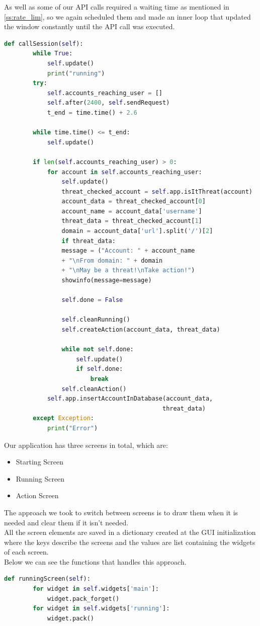 As well as some of our API calls required a waiting time as mentioned in \ref{ss:rate_lim},
so we again scheduled them and made an inner loop that updated the window constantly until the API call was executed.
\\[5pt]
\begin{lstlisting}[language=python, caption={Updating the window while calling API functions}, captionpos=b]
	def callSession(self):
		while True:
			self.update()
			print("running")
		try:
			self.accounts_reaching_user = []
			self.after(2400, self.sendRequest)
			t_end = time.time() + 2.6
		
		while time.time() <= t_end:
			self.update()
		
		if len(self.accounts_reaching_user) > 0:
			for account in self.accounts_reaching_user:
				self.update()
				threat_checked_account = self.app.isItThreat(account)
				account_data = threat_checked_account[0]
				account_name = account_data['username']
				threat_data = threat_checked_account[1]
				domain = account_data['url'].split('/')[2]
				if threat_data:
				message = ("Account: " + account_name
				+ "\nFrom domain: " + domain 
				+ "\nMay be a threat!\nTake action!")
				showinfo(message=message)
		
				self.done = False
		
				self.cleanRunning() 
				self.createAction(account_data, threat_data)
		
				while not self.done:
					self.update()
					if self.done:
						break
				self.cleanAction()
			self.app.insertAccountInDatabase(account_data, 
											threat_data)
		except Exception:
			print("Error")
\end{lstlisting}
Our application has three screens in total, which are:
\begin{itemize}
	\item Starting Screen
	\item Running Screen
	\item Action Screen
\end{itemize}
The approach we took to switch between screens is to draw them when it is needed and
clear them if it isn't needed.
\\[5pt]
All the screen elements are saved in a dictionary created at the GUI initialization where the keys
describe the screens and the values are list containing the widgets of each screen.
\\[5pt]
Below we can see the functions that handles this approach.
\\[5pt]
\begin{lstlisting}[language=python, caption={Switching from starting screen to running screen}, captionpos=b]
	def runningScreen(self):
		for widget in self.widgets['main']:
			widget.pack_forget()
		for widget in self.widgets['running']:
			widget.pack()
\end{lstlisting}

